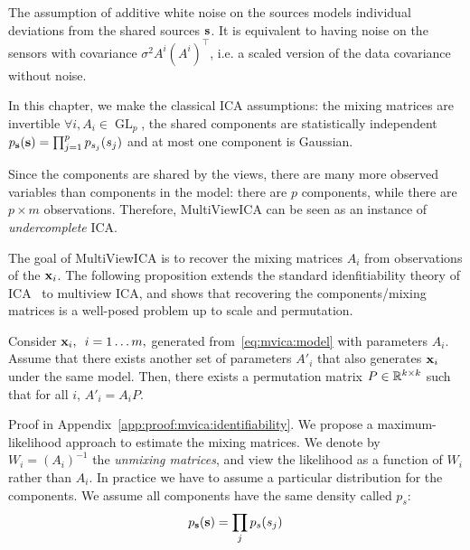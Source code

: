 \documentclass{report}
\DeclareMathOperator{\GL}{GL}
\begin{document}
{The assumption of additive white noise on the sources models individual deviations from the shared sources $\mathbf{s}$.
It is equivalent to having noise on the sensors with covariance $\sigma^2 A^i \left(A^i\right)^{\top}$, i.e. a scaled version of the data covariance without noise.

In this chapter, we make the classical ICA assumptions: the mixing matrices are invertible $\forall i, A_i \in \GL_p$, the shared components are
statistically independent $p_{\mathbf{s}}(\mathbf{s}) = \prod_{j=1}^p p_{s_j}(s_j)$ and at most one component is Gaussian. 

Since the components are shared by the views, there are many more observed variables than components in the model: there are $p$ components, while there are $p \times m$ observations.
Therefore, MultiViewICA can be seen as an instance of \emph{undercomplete} ICA.
%

The goal of MultiViewICA is to recover the mixing matrices $A_i$ from observations of the $\mathbf{x}_i$.
The following proposition extends the standard idenfitiability theory of ICA~\cite{comon1994independent} to multiview ICA, and shows that recovering the components/mixing matrices is a well-posed problem up to scale and permutation.
%
\begin{proposition}
\label{prop:identifiability}
Consider $\mathbf{x}_i, \enspace i=1\dots m,$ generated from~\eqref{eq:mvica:model}
with parameters $A_i$. Assume that there exists another set of parameters
$A'_i$ that also generates $\mathbf{x}_i$ under the same model.
Then, there exists a permutation matrix $P\in \mathbb{R}^{k\times k}$ such that for all $i$, $A'_i = A_i P$.
\end{proposition}
Proof in Appendix~\ref{app:proof:mvica:identifiability}.
%
%
%
%
%
%
%
We propose a maximum-likelihood approach to estimate the mixing matrices. 
We denote by $W_i = (A_i)^{-1}$ the \emph{unmixing matrices}, and view the
likelihood as a function of $W_i$ rather than $A_i$.
In practice we have to assume a particular distribution for the components. We
assume all components have the same density called $p_s$:
\[
  p_{\mathbf{s}}(\mathbf{s}) = \prod_j p_s(s_j)
\]

}
\end{document}
